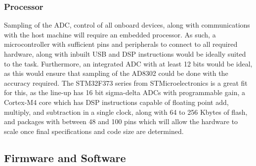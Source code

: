 \subsubsection{Processor}
Sampling of the ADC, control of all onboard devices, along with communications with the host machine will require an embedded processor. As such, a microcontroller with sufficient pins and peripherals to connect to all required hardware, along with inbuilt USB and DSP instructions would be ideally suited to the task. Furthermore, an integrated ADC with at least 12 bits would be ideal, as this would ensure that sampling of the AD8302 could be done with the accuracy required. The STM32F373 series from STMicroelectronics is a great fit for this, as the line-up has 16 bit sigma-delta ADCs with programmable gain, a Cortex-M4 core which has DSP instructions capable of floating point add, multiply, and subtraction in a single clock, along with 64 to 256 Kbytes of flash, and packages with between 48 and 100 pins which will allow the hardware to scale once final specifications and code size are determined. 

\subsection{Firmware and Software}
\label{subsec:firmware_software}